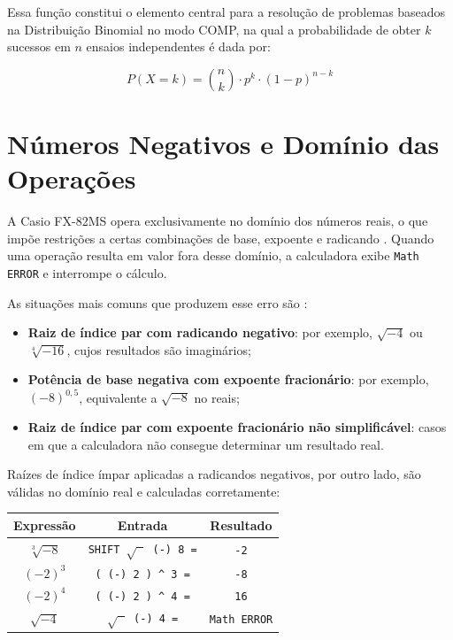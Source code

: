 Essa função constitui o elemento central para a resolução de problemas baseados na Distribuição Binomial no modo COMP, na qual a probabilidade de obter $k$ sucessos em $n$ ensaios independentes é dada por:

\[
    P(X = k) = \binom{n}{k} \cdot p^k \cdot (1-p)^{n-k}
\]

\section{Números Negativos e Domínio das Operações}

A Casio FX-82MS opera exclusivamente no domínio dos números reais, o que impõe restrições a certas combinações de base, expoente e radicando \cite{casio2004}. Quando uma operação resulta em valor fora desse domínio, a calculadora exibe \texttt{Math ERROR} e interrompe o cálculo.

As situações mais comuns que produzem esse erro são \cite{casio2004}:

\begin{itemize}
    \item \textbf{Raiz de índice par com radicando negativo}: por exemplo, $\sqrt{-4}$ ou $\sqrt[4]{-16}$, cujos resultados são imaginários;
    \item \textbf{Potência de base negativa com expoente fracionário}: por exemplo, $(-8)^{0{,}5}$, equivalente a $\sqrt{-8}$ no reais;
    \item \textbf{Raiz de índice par com expoente fracionário não simplificável}: casos em que a calculadora não consegue determinar um resultado real.
\end{itemize}

Raízes de índice ímpar aplicadas a radicandos negativos, por outro lado, são válidas no domínio real e calculadas corretamente:

\begin{center}
\begin{tabular}{|c|c|c|}
    \hline
    \textbf{Expressão} & \textbf{Entrada} & \textbf{Resultado} \\
    \hline
    $\sqrt[3]{-8}$  & \texttt{SHIFT $\sqrt{\phantom{x}}$ (-) 8 =} & \texttt{-2} \\
    $(-2)^3$ & \texttt{( (-) 2 ) \^{} 3 =} & \texttt{-8} \\
    $(-2)^4$ & \texttt{( (-) 2 ) \^{} 4 =} & \texttt{16} \\
    $\sqrt{-4}$ & \texttt{$\sqrt{\phantom{x}}$ (-) 4 =} & \texttt{Math ERROR} \\
    \hline
\end{tabular}
\end{center}

